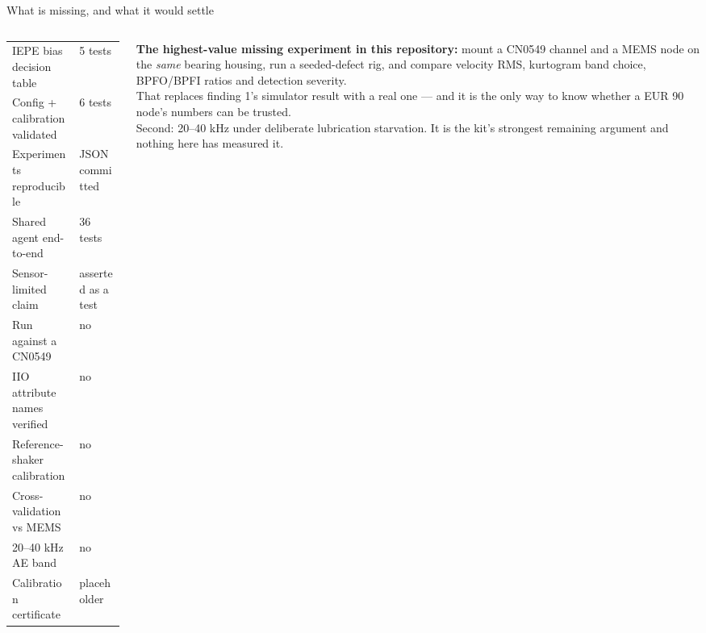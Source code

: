 \documentclass[aspectratio=169,10pt]{beamer}
\begin{document}
\begin{frame}{What is missing, and what it would settle}
  \begin{columns}[T]
    \begin{column}{0.52\textwidth}
      \scriptsize
      \begin{tabular}{@{}ll@{}}
        \toprule
        IEPE bias decision table      & 5 tests \\
        Config + calibration validated& 6 tests \\
        Experiments reproducible      & JSON committed \\
        Shared agent end-to-end       & 36 tests \\
        Sensor-limited claim          & asserted as a test \\
        \midrule
        Run against a CN0549          & \textcolor{pdmcrit}{no} \\
        IIO attribute names verified  & \textcolor{pdmcrit}{no} \\
        Reference-shaker calibration  & \textcolor{pdmcrit}{no} \\
        Cross-validation vs MEMS      & \textcolor{pdmcrit}{no} \\
        20--40 kHz AE band            & \textcolor{pdmcrit}{no} \\
        Calibration certificate       & placeholder \\
        \bottomrule
      \end{tabular}
    \end{column}
    \begin{column}{0.44\textwidth}
      \scriptsize
      \textbf{The highest-value missing experiment in this repository:} mount a
      CN0549 channel and a MEMS node on the \emph{same} bearing housing, run a
      seeded-defect rig, and compare velocity RMS, kurtogram band choice,
      BPFO/BPFI ratios and detection severity.
      \\[2mm]
      That replaces finding 1's simulator result with a real one --- and it is
      the only way to know whether a EUR 90 node's numbers can be trusted.
      \\[2mm]
      \color{pdmink2}
      Second: 20--40 kHz under deliberate lubrication starvation. It is the
      kit's strongest remaining argument and nothing here has measured it.
    \end{column}
  \end{columns}
\end{frame}
\end{document}
